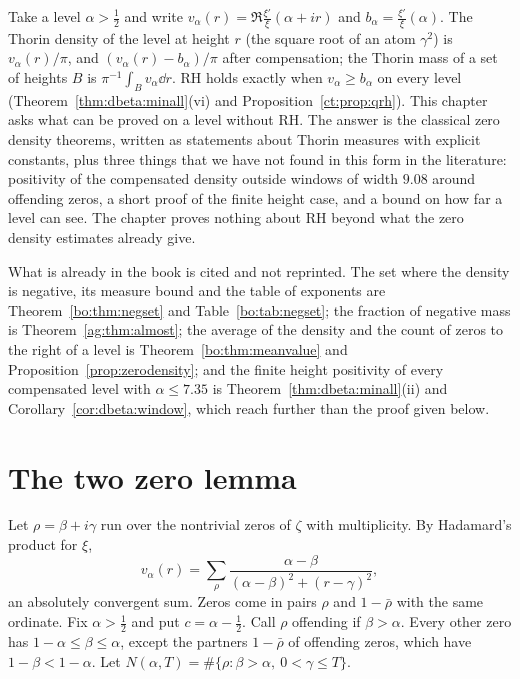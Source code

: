 \label{dz:ch:density}

Take a level $\alpha>\frac12$ and write $v_\alpha(r)=\Re\frac{\xi'}\xi(\alpha+ir)$ and $b_\alpha=\frac{\xi'}\xi(\alpha)$. The Thorin density of the level at height $r$ (the square root of an atom $\gamma^2$) is $v_\alpha(r)/\pi$, and $(v_\alpha(r)-b_\alpha)/\pi$ after compensation; the Thorin mass of a set of heights $B$ is $\pi^{-1}\int_Bv_\alpha\dd r$. RH holds exactly when $v_\alpha\ge b_\alpha$ on every level (Theorem~\ref{thm:dbeta:minall}(vi) and Proposition~\ref{ct:prop:qrh}). This chapter asks what can be proved on a level without RH. The answer is the classical zero density theorems, written as statements about Thorin measures with explicit constants, plus three things that we have not found in this form in the literature: positivity of the compensated density outside windows of width $9.08$ around offending zeros, a short proof of the finite height case, and a bound on how far a level can see. The chapter proves nothing about RH beyond what the zero density estimates already give.

What is already in the book is cited and not reprinted. The set where the density is negative, its measure bound and the table of exponents are Theorem~\ref{bo:thm:negset} and Table~\ref{bo:tab:negset}; the fraction of negative mass is Theorem~\ref{ag:thm:almost}; the average of the density and the count of zeros to the right of a level is Theorem~\ref{bo:thm:meanvalue} and Proposition~\ref{prop:zerodensity}; and the finite height positivity of every compensated level with $\alpha\le7.35$ is Theorem~\ref{thm:dbeta:minall}(ii) and Corollary~\ref{cor:dbeta:window}, which reach further than the proof given below.

\section{The two zero lemma}\label{dz:sec:pair}
Let $\rho=\beta+i\gamma$ run over the nontrivial zeros of $\zeta$ with multiplicity. By Hadamard's product for $\xi$,
\begin{equation}\label{dz:eq:had}
v_\alpha(r)=\sum_\rho\frac{\alpha-\beta}{(\alpha-\beta)^2+(r-\gamma)^2},
\end{equation}
an absolutely convergent sum. Zeros come in pairs $\rho$ and $1-\bar\rho$ with the same ordinate. Fix $\alpha>\frac12$ and put $c=\alpha-\frac12$. Call $\rho$ offending if $\beta>\alpha$. Every other zero has $1-\alpha\le\beta\le\alpha$, except the partners $1-\bar\rho$ of offending zeros, which have $1-\beta<1-\alpha$. Let $N(\alpha,T)=\#\{\rho:\beta>\alpha,\ 0<\gamma\le T\}$.

